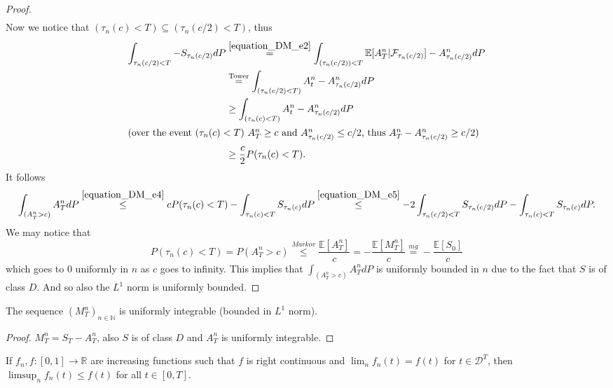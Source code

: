 \begin{proof}
\begin{align}
  \end{align}
  Now we notice that $(\tau_n(c)<T)\subseteq (\tau_n(c/2)<T)$, thus
  \begin{align}\nonumber
  \int_{\tau_n(c/2)<T}-S_{\tau_n(c/2)}dP
  &\stackrel{\eqref{equation_DM_e2}}{=}\int_{(\tau_n(c/2))<T}\mathbb{E}[A^n_T\vert\mathcal{F}_{\tau_n(c/2)}]-A^n_{\tau_n(c/2)}dP \nonumber
  \\
  &\stackrel{\mathrm{Tower}}{=}\int_{(\tau_n(c/2)<T)}A^n_t-A^n_{\tau_n(c/2)}dP\nonumber
  \\
  &\geq \int_{(\tau_n(c)<T)}A^n_t-A^n_{\tau_n(c/2)}dP\nonumber
  \\
  \intertext{(over the event $(\tau_n(c)<T)$ $A^n_T\geq c$ and $A^n_{\tau_n(c/2)}\leq c/2$, thus $A^n_T-A^n_{\tau_n(c/2)}\geq c/2$)}
  &\geq \frac{c}{2}P(\tau_n(c)<T).\label{equation_DM_e5}
  \end{align}
  It follows
  $$
  \int_{(A^n_T>c)}A^n_TdP\stackrel{\eqref{equation_DM_e4}}{\leq}cP(\tau_n(c)<T)-\int_{\tau_n(c)<T}S_{\tau_n(c)}dP\stackrel{\eqref{equation_DM_e5}}{\leq}-2\int_{\tau_n(c/2)<T}S_{\tau_n(c/2)}dP-\int_{\tau_n(c)<T}S_{\tau_n(c)}dP.
  $$
  We may notice that
  $$
  P(\tau_n(c)<T)=P(A^n_T>c)\stackrel{Markov}{\leq}\frac{\mathbb{E}[A^n_T]}{c}=-\frac{\mathbb{E}[M^n_T]}{c}\stackrel{mg}{=}-\frac{\mathbb{E}[S_0]}{c}
  $$
  which goes to $0$ uniformly in $n$ as $c$ goes to infinity.
  This implies that $\int_{(A^n_T>c)}A^n_TdP$ is uniformly bounded in $n$ due to the fact that $S$ is of class $D$. And so also the $L^1$ norm is uniformly bounded.
\end{proof}


\begin{lemma}\label{lem:M_uniform_integrable}
  The sequence $(M^n_T)_{n\in\mathbb{N}}$ is uniformly integrable (bounded in $L^1$ norm).
\end{lemma}

\begin{proof}
  $M^n_T=S_T-A^n_T$, also $S$ is of class $D$ and $A^n_T$ is uniformly integrable.
\end{proof}


\begin{lemma}\label{lem:incr_fun_lim_right_cont_limsup_ineq}
  If $f_n, f : [0, 1] \rightarrow \mathbb{R}$ are increasing functions such that $f$ is right continuous and
  $\lim_n f_n(t) = f (t)$ for $t \in\mathcal{D}^T$, then  $\limsup_n  f_n(t) \leq f (t)$ for all $t \in [0, T]$.
\end{lemma}

